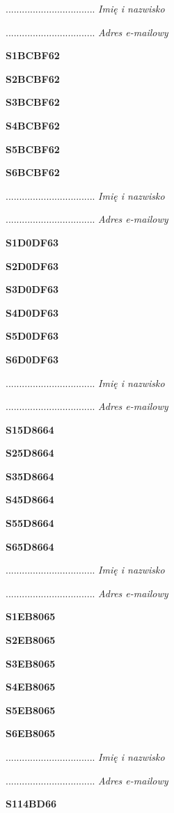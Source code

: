 .................................
\textit{Imię i nazwisko}

.................................
\textit{Adres e-mailowy}

\Large \textbf{S1BCBF62}

\Large \textbf{S2BCBF62}

\Large \textbf{S3BCBF62}

\Large \textbf{S4BCBF62}

\Large \textbf{S5BCBF62}

\Large \textbf{S6BCBF62}

.................................
\textit{Imię i nazwisko}

.................................
\textit{Adres e-mailowy}

\Large \textbf{S1D0DF63}

\Large \textbf{S2D0DF63}

\Large \textbf{S3D0DF63}

\Large \textbf{S4D0DF63}

\Large \textbf{S5D0DF63}

\Large \textbf{S6D0DF63}

.................................
\textit{Imię i nazwisko}

.................................
\textit{Adres e-mailowy}

\Large \textbf{S15D8664}

\Large \textbf{S25D8664}

\Large \textbf{S35D8664}

\Large \textbf{S45D8664}

\Large \textbf{S55D8664}

\Large \textbf{S65D8664}

.................................
\textit{Imię i nazwisko}

.................................
\textit{Adres e-mailowy}

\Large \textbf{S1EB8065}

\Large \textbf{S2EB8065}

\Large \textbf{S3EB8065}

\Large \textbf{S4EB8065}

\Large \textbf{S5EB8065}

\Large \textbf{S6EB8065}

.................................
\textit{Imię i nazwisko}

.................................
\textit{Adres e-mailowy}

\Large \textbf{S114BD66}

